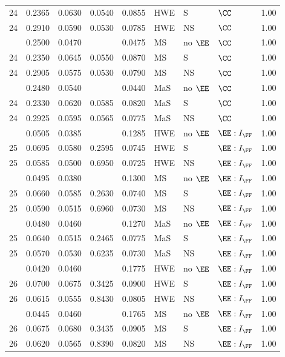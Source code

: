 \begin{longtable}[t]{lllllllll}
24 & 0.2365 & 0.0630 & 0.0540 & 0.0855 & HWE & S & $\CC$ & 1.00\\
24 & 0.2910 & 0.0590 & 0.0530 & 0.0785 & HWE & NS & $\CC$ & 1.00\\
\addlinespace
24 & 0.2500 & 0.0470 &  & 0.0475 & MS & no $\EE$ & $\CC$ & 1.00\\
24 & 0.2350 & 0.0645 & 0.0550 & 0.0870 & MS & S & $\CC$ & 1.00\\
24 & 0.2905 & 0.0575 & 0.0530 & 0.0790 & MS & NS & $\CC$ & 1.00\\
\addlinespace
24 & 0.2480 & 0.0540 &  & 0.0440 & MaS & no $\EE$ & $\CC$ & 1.00\\
24 & 0.2330 & 0.0620 & 0.0585 & 0.0820 & MaS & S & $\CC$ & 1.00\\
24 & 0.2925 & 0.0595 & 0.0565 & 0.0775 & MaS & NS & $\CC$ & 1.00\\
\addlinespace
25 & 0.0505 & 0.0385 &  & 0.1285 & HWE & no $\EE$ & $\EE:I_{\FF}$ & 1.00\\
25 & 0.0695 & 0.0580 & 0.2595 & 0.0745 & HWE & S & $\EE:I_{\FF}$ & 1.00\\
25 & 0.0585 & 0.0500 & 0.6950 & 0.0725 & HWE & NS & $\EE:I_{\FF}$ & 1.00\\
\addlinespace
25 & 0.0495 & 0.0380 &  & 0.1300 & MS & no $\EE$ & $\EE:I_{\FF}$ & 1.00\\
25 & 0.0660 & 0.0585 & 0.2630 & 0.0740 & MS & S & $\EE:I_{\FF}$ & 1.00\\
25 & 0.0590 & 0.0515 & 0.6960 & 0.0730 & MS & NS & $\EE:I_{\FF}$ & 1.00\\
\addlinespace
25 & 0.0480 & 0.0460 &  & 0.1270 & MaS & no $\EE$ & $\EE:I_{\FF}$ & 1.00\\
25 & 0.0640 & 0.0515 & 0.2465 & 0.0775 & MaS & S & $\EE:I_{\FF}$ & 1.00\\
25 & 0.0570 & 0.0530 & 0.6235 & 0.0730 & MaS & NS & $\EE:I_{\FF}$ & 1.00\\
\addlinespace
26 & 0.0420 & 0.0460 &  & 0.1775 & HWE & no $\EE$ & $\EE:I_{\FF}$ & 1.00\\
26 & 0.0700 & 0.0675 & 0.3425 & 0.0900 & HWE & S & $\EE:I_{\FF}$ & 1.00\\
26 & 0.0615 & 0.0555 & 0.8430 & 0.0805 & HWE & NS & $\EE:I_{\FF}$ & 1.00\\
\addlinespace
26 & 0.0445 & 0.0460 &  & 0.1765 & MS & no $\EE$ & $\EE:I_{\FF}$ & 1.00\\
26 & 0.0675 & 0.0680 & 0.3435 & 0.0905 & MS & S & $\EE:I_{\FF}$ & 1.00\\
26 & 0.0620 & 0.0565 & 0.8390 & 0.0820 & MS & NS & $\EE:I_{\FF}$ & 1.00\\

\end{longtable}
